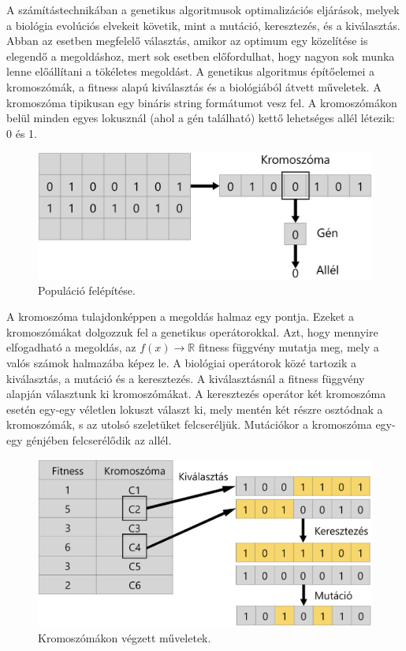 \newpage

A számítástechnikában a genetikus algoritmusok optimalizációs eljárások, melyek a biológia evolúciós elvekeit követik, mint a mutáció, keresztezés, és a kiválasztás. Abban az esetben megfelelő választás, amikor az optimum egy közelítése is elegendő a megoldáshoz, mert sok esetben előfordulhat, hogy nagyon sok munka lenne előállítani a tökéletes megoldást. A genetikus algoritmus építőelemei a kromoszómák, a fitness alapú kiválasztás és a biológiából átvett műveletek. A kromoszóma tipikusan egy bináris string formátumot vesz fel. A kromoszómákon belül minden egyes lokusznál (ahol a gén található) kettő lehetséges allél létezik: 0 és 1.
\begin{figure}[ht]
\centering
\includegraphics[scale=0.13]{images/kromoszoma.png}
\caption{Populáció felépítése.}
\label{fig:kromo}
\end{figure}

\noindent A kromoszóma tulajdonképpen a megoldás halmaz egy pontja. Ezeket a kromoszómákat dolgozzuk fel a genetikus operátorokkal. Azt, hogy mennyire elfogadható a megoldás, az $f(x) \to \mathbb{R}$ fitness függvény mutatja meg, mely a valós számok halmazába képez le. A biológiai operátorok közé tartozik a kiválasztás, a mutáció és a keresztezés. A kiválasztásnál a fitness függvény alapján választunk ki kromoszómákat. A keresztezés operátor két kromoszóma esetén egy-egy véletlen lokuszt választ ki, mely mentén két részre osztódnak a kromoszómák, s az utolsó szeletüket felcseréljük. Mutációkor a kromoszóma egy-egy génjében felcserélődik az allél.
\begin{figure}[ht]
\centering
\includegraphics[scale=0.11]{images/mutacio.png}
\caption{Kromoszómákon végzett műveletek.}
\label{fig:mutac}
\end{figure}

